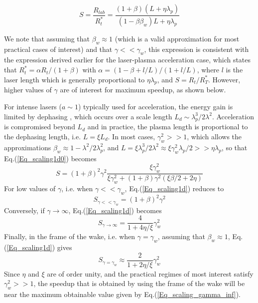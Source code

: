 \begin{equation}
S=\frac{R_{lab}}{R_t^*}=\frac{\left(1+\beta\right)\left(L+\eta \lambda_p\right)}{\left(1-\beta\beta_w\right)L+\eta \lambda_p}
\label{Eq_scaling1d0}
\end{equation}

We note that assuming that $\beta_w\approx1$ (which is a valid approximation for most practical cases of interest) and that $\gamma<<\gamma_w$, this expression is consistent with the expression derived earlier \cite{Vayprl07} for the laser-plasma acceleration case, which states that $R_t^*=\alpha R_t/\left(1+\beta\right)$ with $\alpha=\left(1-\beta+l/L\right)/\left(1+l/L\right)$, where $l$ is the laser length which is generally proportional to $\eta \lambda_p$, and $S=R_t/R_T^*$. However, higher values of $\gamma$ are of interest for maximum speedup, as shown below.

For intense lasers ($a\sim 1$) typically used for acceleration, the energy gain is limited by dephasing \cite{Schroederprl2011}, which occurs over a scale length $L_d \sim \lambda_p^3/2\lambda^2$.
Acceleration is compromised beyond $L_d$ and in practice, the plasma length is proportional to the dephasing length, i.e. $L= \xi L_d$. In most cases, $\gamma_w^2>>1$, which allows the approximations $\beta_w\approx1-\lambda^2/2\lambda_p^2$, and $L=\xi \lambda_p^3/2\lambda^2\approx \xi \gamma_w^2 \lambda_p/2>>\eta \lambda_p$, so that Eq.(\ref{Eq_scaling1d0}) becomes
%
\begin{equation}
S=\left(1+\beta\right)^2\gamma^2\frac{\xi\gamma_w^2}{\xi\gamma_w^2+\left(1+\beta\right)\gamma^2\left(\xi\beta/2+2\eta\right)}
\label{Eq_scaling1d}
\end{equation}
%
For low values of $\gamma$, i.e. when $\gamma<<\gamma_w$, Eq.(\ref{Eq_scaling1d}) reduces to
%
\begin{equation}
S_{\gamma<<\gamma_w}=\left(1+\beta\right)^2\gamma^2
\label{Eq_scaling1d_simpl2}
\end{equation}
%
Conversely, if $\gamma\rightarrow\infty$, Eq.(\ref{Eq_scaling1d}) becomes
%
\begin{equation}
S_{\gamma\rightarrow\infty}=\frac{4}{1+4\eta/\xi}\gamma_w^2
\label{Eq_scaling_gamma_inf}
\end{equation}
%
Finally, in the frame of the wake, i.e. when $\gamma=\gamma_w$, assuming that $\beta_w\approx1$, Eq.(\ref{Eq_scaling1d}) gives
%
\begin{equation}
S_{\gamma=\gamma_w}\approx\frac{2}{1+2\eta/\xi}\gamma_w^2
\label{Eq_scaling_gamma_wake}
\end{equation}
Since $\eta$ and $\xi$ are of order unity, and the practical regimes of most interest satisfy $\gamma_w^2>>1$, the speedup that is obtained by using the frame of the wake will be near the maximum obtainable value given by Eq.(\ref{Eq_scaling_gamma_inf}).

